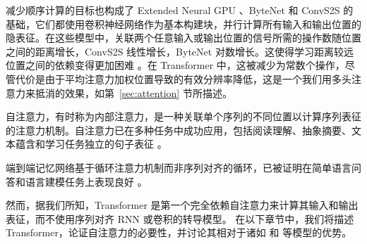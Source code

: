 减少顺序计算的目标也构成了 Extended Neural GPU \citep{extendedngpu}、ByteNet \citep{NalBytenet2017} 和 ConvS2S \citep{JonasFaceNet2017} 的基础，它们都使用卷积神经网络作为基本构建块，并行计算所有输入和输出位置的隐表征。在这些模型中，关联两个任意输入或输出位置的信号所需的操作数随位置之间的距离增长，ConvS2S 线性增长，ByteNet 对数增长。这使得学习距离较远位置之间的依赖变得更加困难 \citep{hochreiter2001gradient}。在 Transformer 中，这被减少为常数个操作，尽管代价是由于平均注意力加权位置导致的有效分辨率降低，这是一个我们用多头注意力来抵消的效果，如第~\ref{sec:attention} 节所描述。 

自注意力，有时称为内部注意力，是一种关联单个序列的不同位置以计算序列表征的注意力机制。自注意力已在多种任务中成功应用，包括阅读理解、抽象摘要、文本蕴含和学习任务独立的句子表征 \citep{cheng2016long, decomposableAttnModel, paulus2017deep, lin2017structured}。

端到端记忆网络基于循环注意力机制而非序列对齐的循环，已被证明在简单语言问答和语言建模任务上表现良好 \citep{sukhbaatar2015}。

然而，据我们所知，Transformer 是第一个完全依赖自注意力来计算其输入和输出表征，而不使用序列对齐 RNN 或卷积的转导模型。
在以下章节中，我们将描述 Transformer，论证自注意力的必要性，并讨论其相对于诸如 \citep{neural_gpu, NalBytenet2017} 和 \citep{JonasFaceNet2017} 等模型的优势。






